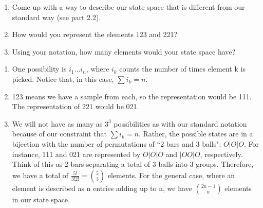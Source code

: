 \begin{Exercise}
\begin{enumerate}[label=(\alph*)]
\item Come up with a way to describe our state space that is different from our standard way (see part 2.2).
\item How would you represent the elements 123 and 221?
\item Using your notation, how many elements would your state space have? 
\end{enumerate}
\end{Exercise}
\begin{Answer}
\begin{enumerate}[label=(\alph*)]
\item One possibility is $i_1 ... i_n$, where $i_k$ counts the number of times element k is picked. Notice that, in this case, $\sum i_k = n$. 
\item 123 means we have a sample from each, so the representation would be 111. The representation of 221 would be 021.
\item We will not have as many as $3^3$ possibilities as with our standard notation because of our constraint that $\sum i_k = n$. Rather, the possible states are in a bijection with the number of permutations of ``2 bars and 3 balls": $O|O|O$. 
For instance, 111 and 021 are represented by $O|O|O$ and $|OO|O$, respectively. Think of this as 2 bars separating a total of 3 balls into 3 groups. 
Therefore, we have a total of $\frac{5!}{3!2!} = \binom{5}{3}$ elements.
For the general case, where an element is described as n entries adding up to n, we have $\binom{2n-1}{n}$ elements in our state space.
\end{enumerate}
\end{Answer}

